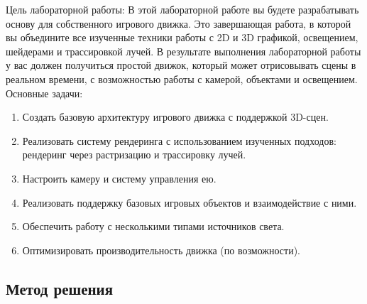 \documentclass[12pt]{article}
\begin{document}
Цель лабораторной работы:
В этой лабораторной работе вы будете разрабатывать основу для собственного игрового
движка. Это завершающая работа, в которой вы объедините все изученные техники работы
с 2D и 3D графикой, освещением, шейдерами и трассировкой лучей. В результате
выполнения лабораторной работы у вас должен получиться простой движок, который
может отрисовывать сцены в реальном времени, с возможностью работы с камерой,
объектами и освещением.
Основные задачи:
\begin{enumerate}
    \item Создать базовую архитектуру игрового движка с поддержкой 3D-сцен.
    \item Реализовать систему рендеринга с использованием изученных подходов: рендеринг через растризацию и трассировку лучей.
    \item Настроить камеру и систему управления ею.
    \item Реализовать поддержку базовых игровых объектов и взаимодействие с ними.
    \item Обеспечить работу с несколькими типами источников света.
    \item Оптимизировать производительность движка (по возможности).
\end{enumerate}

\subsection*{Метод решения}
\end{document}
